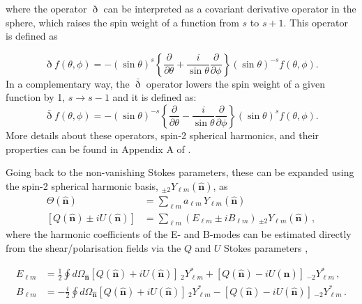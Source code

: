 where the operator $\eth$ can be interpreted as a covariant derivative operator in the sphere, which raises the spin weight of a function from $s$ to $s+1$. This operator is defined as

\begin{equation}
    \eth f(\theta,\phi) = -(\sin\theta)^s\left\{ \frac{\partial}{\partial\theta} + \frac{i}{\sin\theta}\frac{\partial}{\partial\phi}\right\}(\sin\theta)^{-s} f(\theta,\phi).
\end{equation}
In a complementary way, the $\bar{\eth}$ operator lowers the spin weight of a given function by 1, $s\longrightarrow s-1$ and it is defined as:
\begin{equation}
    \bar{\eth} f(\theta,\phi) = -(\sin\theta)^{-s}\left\{ \frac{\partial}{\partial\theta} - \frac{i}{\sin\theta}\frac{\partial}{\partial\phi}\right\}(\sin\theta)^s f(\theta,\phi).
\end{equation}
More details about these operators, spin-2 spherical harmonics, and their properties can be found in Appendix A of \cite{2019NaMaster}.

\qquad Going back to the non-vanishing Stokes parameters, these can be expanded using the spin-2 spherical harmonic basis, $_{\pm 2}Y_{\ell m}(\hat{\mathbf{n}})$, as 
\begin{align}
\label{eqn::chCmbPol_stokes_paras}
\Theta(\hat{\mathbf{n}}) &= \sum_{\ell m}a_{\ell m}\,Y_{\ell m}(\hat{\mathbf{n}}) \\
\left[ Q(\hat{\mathbf{n}})\pm iU(\hat{\mathbf{n}}) \right] &= \sum_{\ell m}\left(E_{\ell m}\pm iB_{\ell m} \right)\,_{\pm 2}Y_{\ell m}(\hat{\mathbf{n}})\, ,
\end{align}
\noindent where the harmonic coefficients of the E- and B-modes can be estimated directly from the shear/polarisation fields via the $Q$ and $U$ Stokes parameters \citep{PolSpice2005,Hikage2011},

\begin{align}
E_{\ell m} & = \frac{1}{2}\oint d\Omega_{\hat{\mathbf{n}}} \left[ Q(\hat{\mathbf{n}}) + iU(\hat{\mathbf{n}}) \right]\,_2Y^*_{\ell m} + \left[ Q(\hat{\mathbf{n}}) - iU(\hat{\mathbf{n}}) \right]\,_{-2}Y^*_{\ell m} \, ,\\
B_{\ell m} & = -\frac{i}{2}\oint d\Omega_{\hat{\mathbf{n}}} \left[ Q(\hat{\mathbf{n}}) + iU(\hat{\mathbf{n}}) \right]\,_2Y^*_{\ell m} - \left[ Q(\hat{\mathbf{n}}) - iU(\hat{\mathbf{n}}) \right]\,_{-2}Y^*_{\ell m}\, .
\end{align}

